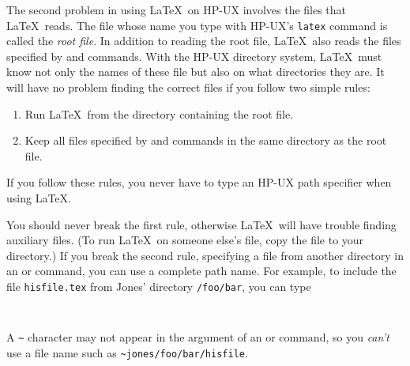 The second problem in using \LaTeX\ on HP-UX involves the files that
\LaTeX\ reads.  The file whose name you type with HP-UX's {\tt latex}
command is called the {\em root file}.  In addition to reading the root
file, \LaTeX\ also reads the files specified by \hbox{\verb||}
and \hbox{\verb||} commands.  With the HP-UX directory system,
\LaTeX\ must know not only the names of these file but also on what
directories they are.  It will have no problem finding the correct
files if you follow two simple rules:
\begin{enumerate}
 \item Run \LaTeX\ from the directory containing the root file.
 \item Keep all files specified by \hbox{\verb||} and 
      \hbox{\verb||} commands in the same directory as the root
       file.
\end{enumerate}
If you follow these rules, you never have to type an HP-UX path
specifier when using \LaTeX.

You should never break the first rule, otherwise \LaTeX\ will have
trouble finding auxiliary files.  (To run \LaTeX\ on someone else's
file, copy the file to your directory.) If you break the second
rule, specifying a file from another directory in an
\hbox{\verb||} or \hbox{\verb||} command, you can use a
complete path name.  For example, to include the file \mbox{\tt hisfile.tex} 
from Jones' directory \hbox{\verb|/foo/bar|}, you can type
\begin{verbatim}
     
\end{verbatim}
A \verb|~| character may not appear in the argument of an
\hbox{\verb||} or \hbox{\verb||} command, so you {\em
can't\/} use a file name such as \hbox{\verb|~jones/foo/bar/hisfile|}.

